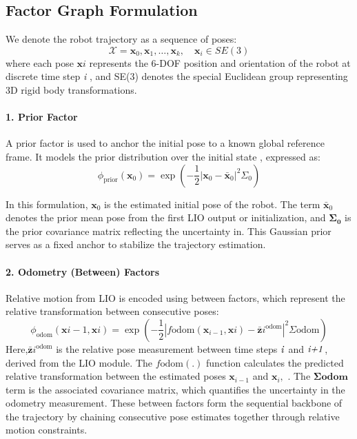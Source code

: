 \subsection{Factor Graph Formulation}

We denote the robot trajectory as a sequence of poses:
\begin{equation}
	\mathcal{X} = { \mathbf{x}_0, \mathbf{x}_1, \dots, \mathbf{x}_k }, \quad \mathbf{x}_i \in SE(3)
\end{equation}
where each pose $\mathbf{x}i $  represents the 6-DOF position and orientation of the robot at discrete time step \textit{i} , and SE(3) denotes the special Euclidean group representing 3D rigid body transformations.

\paragraph{1. Prior Factor}
A prior factor is used to anchor the initial pose to a known global reference frame. It models the prior distribution over the initial state , expressed as:
\begin{equation}
	\phi_{\text{prior}}(\mathbf{x}_0) = \exp\left( -\frac{1}{2} | \mathbf{x}_0 - \bar{\mathbf{x}}_0 |^2{\Sigma_0} \right)
\end{equation}

In this formulation, $\mathbf{x}_0$ is the estimated initial pose of the robot. The term $\bar{\mathbf{x}}_0$ denotes the prior mean pose from the first LIO output or initialization, and $\mathbf{{\Sigma_0}}$ is the prior covariance matrix reflecting the uncertainty in. This Gaussian prior serves as a fixed anchor to stabilize the trajectory estimation.

\paragraph{2. Odometry (Between) Factors}
Relative motion from LIO is encoded using between factors, which represent the relative transformation between consecutive poses:
\begin{equation}
	\phi_{\text{odom}}(\mathbf{x}{i-1}, \mathbf{x}i) = \exp\left( -\frac{1}{2} \left| f{\text{odom}}(\mathbf{x}_{i-1}, \mathbf{x}i) - \bar{\mathbf{z}}i^{\text{odom}} \right|^2{\Sigma{\text{odom}}} \right)
\end{equation}
Here,$\bar{\mathbf{z}}i^{\text{odom}}$ is the relative pose measurement between time steps $\text{\textit{i}}$  and $\text{\textit{i+1}}$, derived from the LIO module. The $f{\text{odom}(\mathbf{.})}$
function  calculates the predicted relative transformation between the estimated poses $\mathbf{x}_{i-1}$ and $\mathbf{x}_{i},$ . The $ \mathbf{\Sigma{\text{odom}}}$ term   is the associated covariance matrix, which quantifies the uncertainty in the odometry measurement. These between factors form the sequential backbone of the trajectory by chaining consecutive pose estimates together through relative motion constraints.

